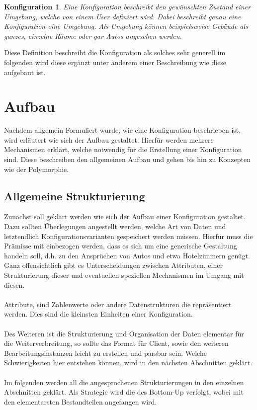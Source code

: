 \newtheorem{mydef}{Konfiguration}
\begin{mydef}
Eine Konfiguration beschreibt den gewünschten Zustand einer Umgebung, welche von einem User definiert wird. Dabei beschreibt genau eine Konfiguration eine Umgebung. Als
Umgebung können beispielsweise Gebäude als ganzes, einzelne Räume oder gar Autos angesehen werden.
\end{mydef}

Diese Definition beschreibt die Konfiguration als solches sehr generell im folgenden wird diese ergänzt unter anderem einer Beschreibung wie diese aufgebaut ist. 

\section{Aufbau}
Nachdem allgemein Formuliert wurde, wie eine Konfiguration beschrieben ist, wird erläutert wie sich der Aufbau gestaltet. Hierfür werden mehrere Mechanismen erklärt, welche notwendig für die Erstellung einer Konfiguration sind. Diese beschreiben den allgemeinen Aufbau und gehen bis hin zu Konzepten wie der Polymorphie. 

\subsection{Allgemeine Strukturierung}
Zunächst soll geklärt werden wie sich der Aufbau einer Konfiguration gestaltet. Dazu sollten Überlegungen angestellt werden, welche Art von Daten und letztendlich Konfigurationsvarianten gespeichert werden müssen. Hierfür muss die Prämisse mit einbezogen werden, dass es sich um eine generische Gestaltung handeln soll, d.h. zu den Ansprüchen von Autos und etwa Hotelzimmern genügt. 
Ganz offensichtlich gibt es Unterscheidungen zwischen Attributen, einer Strukturierung dieser und eventuellen speziellen Mechanismen im Umgang mit diesen.
\\\\
Attribute, sind Zahlenwerte oder andere Datenstrukturen die repräsentiert werden. Dies sind die kleinsten Einheiten einer Konfiguration.
\\\\
Des Weiteren ist die Strukturierung und Organisation der Daten elementar für die Weiterverbreitung, so sollte das Format für Client, sowie den weiteren Bearbeitungsinstanzen leicht zu erstellen und parsbar sein. Welche Schwierigkeiten hier entstehen können, wird in den nächsten Abschnitten geklärt. 
\\\\
Im folgenden werden all die angesprochenen Strukturierungen in den einzelnen Abschnitten geklärt. Als Strategie wird die des Bottom-Up verfolgt, wobei mit den elementarsten Bestandteilen angefangen wird. 

